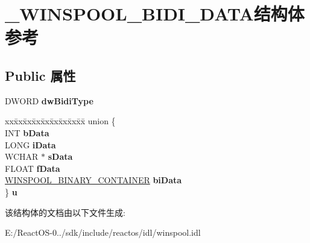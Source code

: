 \hypertarget{struct___w_i_n_s_p_o_o_l___b_i_d_i___d_a_t_a}{}\section{\+\_\+\+W\+I\+N\+S\+P\+O\+O\+L\+\_\+\+B\+I\+D\+I\+\_\+\+D\+A\+T\+A结构体 参考}
\label{struct___w_i_n_s_p_o_o_l___b_i_d_i___d_a_t_a}
\subsection*{Public 属性}
\begin{DoxyCompactItemize}
\item 
\mbox{\label{struct___w_i_n_s_p_o_o_l___b_i_d_i___d_a_t_a_a01d72bdec946ab0ef80ac7558eb392fd}} 
D\+W\+O\+RD {\bfseries dw\+Bidi\+Type}
\item 
\mbox{\label{struct___w_i_n_s_p_o_o_l___b_i_d_i___d_a_t_a_a1bba89a5f864829c3036aea2bdf0a3d7}} 
\begin{tabbing}
xx\=xx\=xx\=xx\=xx\=xx\=xx\=xx\=xx\=\kill
union \{\\
\>INT {\bfseries bData}\\
\>LONG {\bfseries iData}\\
\>WCHAR $\ast$ {\bfseries sData}\\
\>FLOAT {\bfseries fData}\\
\>\hyperlink{struct___w_i_n_s_p_o_o_l___b_i_n_a_r_y___c_o_n_t_a_i_n_e_r}{WINSPOOL\_BINARY\_CONTAINER} {\bfseries biData}\\
\} {\bfseries u}\\

\end{tabbing}\end{DoxyCompactItemize}


该结构体的文档由以下文件生成\+:\begin{DoxyCompactItemize}
\item 
E\+:/\+React\+O\+S-\/0../sdk/include/reactos/idl/winspool.\+idl\end{DoxyCompactItemize}
